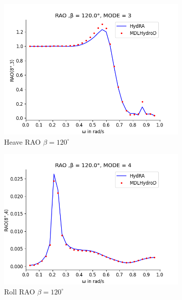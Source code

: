 \begin{figure}[H]
    \vspace{5pt}%
    \begin{subfigure}[b]{0.49\textwidth}
        \includegraphics[width=\textwidth]{plots/kcs/rao/rao3.png}
        \caption{Heave RAO $\beta = 120^{\circ}$}
    \end{subfigure}
    \begin{subfigure}[b]{0.49\textwidth}
        \includegraphics[width=\textwidth]{plots/kcs/rao/rao4.png}
        \caption{Roll RAO $\beta = 120^{\circ}$}
    \end{subfigure}
    \vspace{5pt}%
    \begin{subfigure}[b]{0.49\textwidth}

\end{subfigure}
\end{figure}
